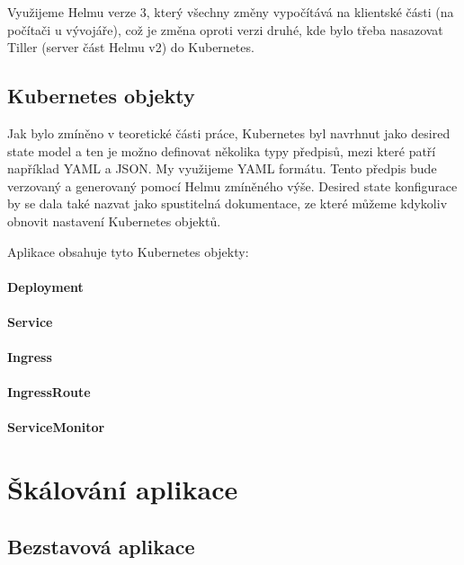 \documentclass[thesis=M,czech]{FITthesis}[2019/12/23]
\theoremstyle{plain}
\theoremstyle{definition}
\begin{document}
Využijeme Helmu verze 3, který všechny změny vypočítává na klientské části (na počítači u vývojáře), což je změna oproti verzi druhé, kde bylo třeba nasazovat Tiller (server část Helmu v2) do Kubernetes.

\subsection{Kubernetes objekty}


Jak bylo zmíněno v teoretické části práce, Kubernetes byl navrhnut jako desired state model a ten je možno definovat několika typy předpisů, mezi které patří například YAML a JSON. My využijeme YAML formátu. Tento předpis bude verzovaný a generovaný pomocí Helmu zmíněného výše. Desired state konfigurace by se dala také nazvat jako spustitelná dokumentace, ze které můžeme kdykoliv obnovit nastavení Kubernetes objektů. 

Aplikace obsahuje tyto Kubernetes objekty:

\paragraph{Deployment}
\paragraph{Service}
\paragraph{Ingress}
\paragraph{IngressRoute}
\paragraph{ServiceMonitor}

\section{Škálování aplikace}


\subsection{Bezstavová aplikace}
\end{document}
